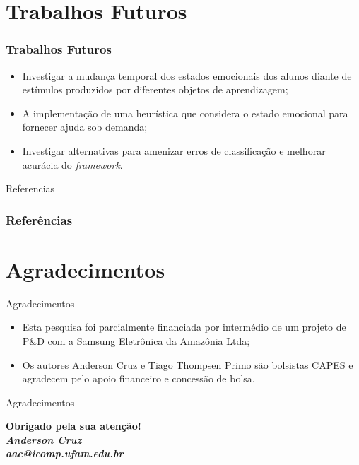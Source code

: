 \documentclass{beamer}
\begin{document}






\section{Trabalhos Futuros}
\begin{frame}
\frametitle{Trabalhos Futuros}
\pause
\begin{itemize}
\item Investigar a mudan\c{c}a temporal dos estados emocionais dos alunos diante de est\'{i}mulos produzidos por diferentes objetos de aprendizagem;
\pause
\item A implementa\c{c}\~ao de uma heur\'istica que considera o estado emocional para fornecer ajuda sob demanda;
\pause
\item Investigar alternativas para amenizar erros de classifica\c{c}\~ao e melhorar acur\'acia do \textit{framework}.
\end{itemize}

\end{frame}

\begin{frame}{Referencias}
\frametitle{Refer\^encias}
    \tiny{ }
    
\end{frame}


\section{Agradecimentos}
 \begin{frame}{Agradecimentos}
\begin{itemize}
 \item Esta pesquisa foi parcialmente financiada por intermédio de um projeto de P\&D com a
Samsung Eletr\^{o}nica da Amaz\^{o}nia Ltda; 
\item Os autores Anderson Cruz e Tiago Thompsen
Primo s\~ao bolsistas CAPES e agradecem pelo​ ​apoio​ ​financeiro ​e​ ​concess\~ao​ ​de​ ​bolsa. 
\end{itemize}

\end{frame}

  \begin{frame}{Agradecimentos}
  \begin{center}
 
  \textcolor{VerdeUFAM}{\Large \textbf{Obrigado pela sua aten\c{c}\~ao!}} \\
  \vspace*{20px}
  \textit{\textbf{Anderson Cruz}} \\
  \textit{\textbf{aac@icomp.ufam.edu.br}}
 
  \end{center}
  \end{frame}

 
 
 
\end{document}
